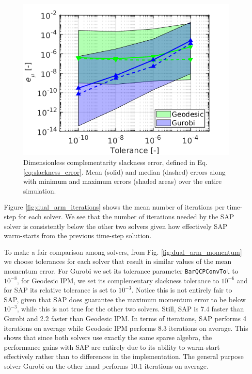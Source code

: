 \begin{figure}[!h]
	\centering
    \includegraphics[width=0.7\columnwidth]{figures/dual_arm/optimality_condition.png}
    \caption{\label{fig:dual_arm_slackness} Dimensionless complementarity
    slackness error, defined in Eq. \eqref{eq:slackness_error}. Mean (solid) and
    median (dashed) errors along with minimum and maximum errors (shaded areas) over
    the entire simulation.}
\end{figure}

Figure \ref{fig:dual_arm_iterations} shows the mean number of iterations per
time-step for each solver. We see that the number of iterations needed by the
SAP solver is consistently below the other two solvers given how effectively SAP
warm-starts from the previous time-step solution.

To make a fair comparison among solvers, from Fig.
\ref{fig:dual_arm_momentum} we choose tolerances for each solver that result in
similar values of the mean momentum error. For Gurobi we set its tolerance
parameter \verb+BarQCPConvTol+ to $10^{-8}$, for Geodesic IPM, we set its
complementary slackness tolerance to $10^{-6}$ and for SAP its relative tolerance is set
to $10^{-3}$. Notice this is not entirely fair to SAP, given that SAP does
guarantee the maximum momentum error to be below $10^{-3}$, while this is not
true for the other two solvers. Still, SAP is 7.4 faster than Gurobi and 2.2
faster than Geodesic IPM. In terms of iterations, SAP performs 4 iterations on
average while Geodesic IPM performs 8.3 iterations on average. This shows that
since both solvers use exactly the same sparse algebra, the performance gains
with SAP are entirely due to its ability to warm-start effectively rather than
to differences in the implementation. The general purpose solver Gurobi on the
other hand performs 10.1 iterations on average.

